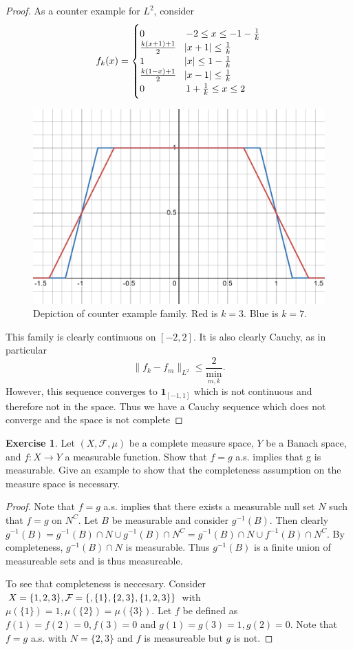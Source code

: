 \documentclass{amsart}
\theoremstyle{plain}
\theoremstyle{definition}
\newtheorem{exer}{Exercise}[section]
\begin{document}
\begin{proof}
    \par As a counter example for $L^2$, consider
    $$f_k(x) = \begin{cases}
        0 & -2\leq x \leq -1-\frac{1}{k}\\
        \frac{k(x+1)+1}{2}& \abs{x+1}\leq \frac{1}{k}\\
        1 & \abs{x}\leq 1-\frac{1}{k}\\
        \frac{k(1-x)+1}{2}& \abs{x-1}\leq \frac{1}{k}\\
        0 & 1+\frac{1}{k}\leq x\leq 2
    \end{cases}$$
    \begin{figure}[h!]
        \centering
        \includegraphics[width=0.5\linewidth]{Chapter 1/Photos/Problem1Counter.png}
        \caption{Depiction of counter example family. Red is $k=3$. Blue is $k=7$.}
        \label{fig:Problem_1_counter}
    \end{figure}
    This family is clearly continuous on $[-2,2].$ It is also clearly Cauchy, as in particular
    $$\|f_k - f_m\|_{L^2} \leq \frac{2}{\min_{m,k}}.$$
    However, this sequence converges to $\mathbf{1}_{[-1,1]}$ which is not continuous and therefore not in the space. Thus we have a Cauchy sequence which does not converge and the space is not complete
\end{proof}

\begin{exer}
    Let $\left(X,\mathcal{F},\mu \right)$ be a complete measure space, $Y$ be a Banach space, and $f : X \to Y$ a measurable function. Show that $f = g$ a.s. implies that g is measurable. Give an example to show that the completeness assumption on the measure space is necessary.
\end{exer}
\begin{proof}
Note that $f= g$ a.s. implies that there exists a measurable null set $N$ such that $f=g$ on $N^C$. Let $B$ be measurable and consider $g^{-1}(B).$ Then clearly $g^{-1}(B) = g^{-1}(B)\cap N \cup g^{-1}(B) \cap N^C = g^{-1}(B)\cap N \cup f^{-1}(B) \cap N^C.$ By completeness, $g^{-1}(B)\cap N$ is measurable. Thus $g^{-1}(B)$ is a finite union of measureable sets and is thus measureable. 
\par To see that completeness is neccesary. Consider $X = \{1,2,3\}, \mathcal{F} = \{\empty,\{1\},\{2,3\},\{1,2,3\}\}$ with $\mu\left(\{1\}\right) = 1, \mu\left(\{2\}\right)=\mu\left(\{3\}\right).$ Let $f$ be defined as $f(1) = f(2) = 0, f(3) = 0$ and $g(1)=g(3) = 1, g(2) = 0$. Note that $f = g$ a.s. with $N = \{2,3\}$ and $f$ is measureable but $g$ is not.  
\end{proof}
\end{document}
